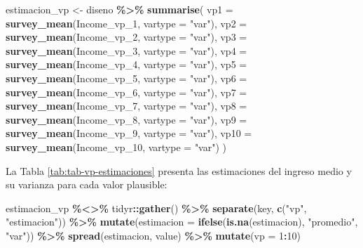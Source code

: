 \documentclass[
  spanish,
  12pt,
]{book}
\newenvironment{Shaded}{\begin{snugshade}}{\end{snugshade}}
\newcommand{\AttributeTok}[1]{\textcolor[rgb]{0.13,0.29,0.53}{#1}}
\newcommand{\DecValTok}[1]{\textcolor[rgb]{0.00,0.00,0.81}{#1}}
\newcommand{\FunctionTok}[1]{\textcolor[rgb]{0.13,0.29,0.53}{\textbf{#1}}}
\newcommand{\NormalTok}[1]{#1}
\newcommand{\OtherTok}[1]{\textcolor[rgb]{0.56,0.35,0.01}{#1}}
\newcommand{\SpecialCharTok}[1]{\textcolor[rgb]{0.81,0.36,0.00}{\textbf{#1}}}
\newcommand{\StringTok}[1]{\textcolor[rgb]{0.31,0.60,0.02}{#1}}
\begin{document}
\begin{Shaded}
\begin{Highlighting}[]
\NormalTok{estimacion\_vp }\OtherTok{\textless{}{-}}\NormalTok{ diseno }\SpecialCharTok{\%\textgreater{}\%}
  \FunctionTok{summarise}\NormalTok{(}
    \AttributeTok{vp1  =} \FunctionTok{survey\_mean}\NormalTok{(Income\_vp\_1,  }\AttributeTok{vartype =} \StringTok{"var"}\NormalTok{),}
    \AttributeTok{vp2  =} \FunctionTok{survey\_mean}\NormalTok{(Income\_vp\_2,  }\AttributeTok{vartype =} \StringTok{"var"}\NormalTok{),}
    \AttributeTok{vp3  =} \FunctionTok{survey\_mean}\NormalTok{(Income\_vp\_3,  }\AttributeTok{vartype =} \StringTok{"var"}\NormalTok{),}
    \AttributeTok{vp4  =} \FunctionTok{survey\_mean}\NormalTok{(Income\_vp\_4,  }\AttributeTok{vartype =} \StringTok{"var"}\NormalTok{),}
    \AttributeTok{vp5  =} \FunctionTok{survey\_mean}\NormalTok{(Income\_vp\_5,  }\AttributeTok{vartype =} \StringTok{"var"}\NormalTok{),}
    \AttributeTok{vp6  =} \FunctionTok{survey\_mean}\NormalTok{(Income\_vp\_6,  }\AttributeTok{vartype =} \StringTok{"var"}\NormalTok{),}
    \AttributeTok{vp7  =} \FunctionTok{survey\_mean}\NormalTok{(Income\_vp\_7,  }\AttributeTok{vartype =} \StringTok{"var"}\NormalTok{),}
    \AttributeTok{vp8  =} \FunctionTok{survey\_mean}\NormalTok{(Income\_vp\_8,  }\AttributeTok{vartype =} \StringTok{"var"}\NormalTok{),}
    \AttributeTok{vp9  =} \FunctionTok{survey\_mean}\NormalTok{(Income\_vp\_9,  }\AttributeTok{vartype =} \StringTok{"var"}\NormalTok{),}
    \AttributeTok{vp10 =} \FunctionTok{survey\_mean}\NormalTok{(Income\_vp\_10, }\AttributeTok{vartype =} \StringTok{"var"}\NormalTok{)}
\NormalTok{  )}
\end{Highlighting}
\end{Shaded}

La Tabla \ref{tab:tab-vp-estimaciones} presenta las estimaciones del ingreso medio y su varianza para cada valor plausible:

\begin{Shaded}
\begin{Highlighting}[]
\NormalTok{estimacion\_vp }\SpecialCharTok{\%\textless{}\textgreater{}\%}
\NormalTok{  tidyr}\SpecialCharTok{::}\FunctionTok{gather}\NormalTok{() }\SpecialCharTok{\%\textgreater{}\%}
  \FunctionTok{separate}\NormalTok{(key, }\FunctionTok{c}\NormalTok{(}\StringTok{"vp"}\NormalTok{, }\StringTok{"estimacion"}\NormalTok{)) }\SpecialCharTok{\%\textgreater{}\%}
  \FunctionTok{mutate}\NormalTok{(}\AttributeTok{estimacion =} \FunctionTok{ifelse}\NormalTok{(}\FunctionTok{is.na}\NormalTok{(estimacion), }\StringTok{"promedio"}\NormalTok{, }\StringTok{"var"}\NormalTok{)) }\SpecialCharTok{\%\textgreater{}\%}
  \FunctionTok{spread}\NormalTok{(estimacion, value) }\SpecialCharTok{\%\textgreater{}\%}
  \FunctionTok{mutate}\NormalTok{(}\AttributeTok{vp =} \DecValTok{1}\SpecialCharTok{:}\DecValTok{10}\NormalTok{)}
\end{Highlighting}
\end{Shaded}
\end{document}
